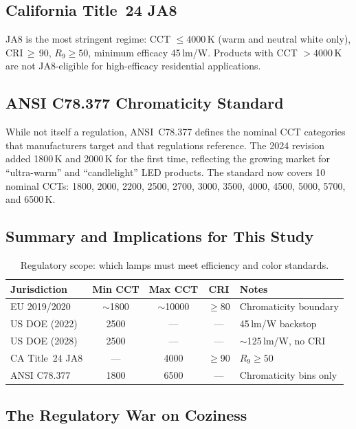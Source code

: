 \documentclass[11pt]{article}
\begin{document}
\subsection{California Title~24 JA8}

JA8 is the most stringent regime: CCT $\leq 4000$\,K (warm and
neutral white only), CRI\,$\geq$\,90, $R_9 \geq 50$, minimum
efficacy 45\,lm/W.  Products with CCT $> 4000$\,K are not JA8-eligible
for high-efficacy residential applications.

\subsection{ANSI C78.377 Chromaticity Standard}

While not itself a regulation, ANSI~C78.377 defines the nominal CCT
categories that manufacturers target and that regulations reference.
The 2024 revision added 1800\,K and 2000\,K for the first time,
reflecting the growing market for ``ultra-warm'' and ``candlelight''
LED products.  The standard now covers 10 nominal CCTs: 1800, 2000,
2200, 2500, 2700, 3000, 3500, 4000, 4500, 5000, 5700, and 6500\,K.

\subsection{Summary and Implications for This Study}

\begin{table}[H]
\centering
\caption{Regulatory scope: which lamps must meet efficiency and color
  standards.}
\label{tab:scope}
\begin{tabular}{lcccl}
\toprule
Jurisdiction & Min CCT & Max CCT & CRI & Notes \\
\midrule
EU 2019/2020 & $\sim$1800 & $\sim$10000 & $\geq$80
  & Chromaticity boundary \\
US DOE (2022) & 2500 & --- & ---
  & 45\,lm/W backstop \\
US DOE (2028) & 2500 & --- & ---
  & $\sim$125\,lm/W, no CRI \\
CA Title~24 JA8 & --- & 4000 & $\geq$90
  & $R_9 \geq 50$ \\
ANSI C78.377 & 1800 & 6500 & ---
  & Chromaticity bins only \\
\bottomrule
\end{tabular}
\end{table}

\subsection{The Regulatory War on Coziness}
\end{document}
